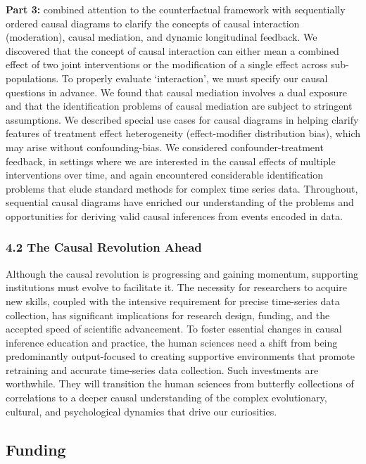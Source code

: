 \documentclass[
  singlecolumn]{article}
\begin{document}
\textbf{Part 3:} combined attention to the counterfactual framework with
sequentially ordered causal diagrams to clarify the concepts of causal
interaction (moderation), causal mediation, and dynamic longitudinal
feedback. We discovered that the concept of causal interaction can
either mean a combined effect of two joint interventions or the
modification of a single effect across sub-populations. To properly
evaluate `interaction', we must specify our causal questions in advance.
We found that causal mediation involves a dual exposure and that the
identification problems of causal mediation are subject to stringent
assumptions. We described special use cases for causal diagrams in
helping clarify features of treatment effect heterogeneity
(effect-modifier distribution bias), which may arise without
confounding-bias. We considered confounder-treatment feedback, in
settings where we are interested in the causal effects of multiple
interventions over time, and again encountered considerable
identification problems that elude standard methods for complex time
series data. Throughout, sequential causal diagrams have enriched our
understanding of the problems and opportunities for deriving valid
causal inferences from events encoded in data.

\subsubsection{4.2 The Causal Revolution
Ahead}\label{the-causal-revolution-ahead}

Although the causal revolution is progressing and gaining momentum,
supporting institutions must evolve to facilitate it. The necessity for
researchers to acquire new skills, coupled with the intensive
requirement for precise time-series data collection, has significant
implications for research design, funding, and the accepted speed of
scientific advancement. To foster essential changes in causal inference
education and practice, the human sciences need a shift from being
predominantly output-focused to creating supportive environments that
promote retraining and accurate time-series data collection. Such
investments are worthwhile. They will transition the human sciences from
butterfly collections of correlations to a deeper causal understanding
of the complex evolutionary, cultural, and psychological dynamics that
drive our curiosities.

\newpage{}

\subsection{Funding}\label{funding}
\end{document}
